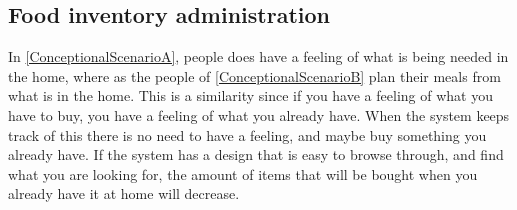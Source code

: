 \subsection{Food inventory administration}

In \ref{ConceptionalScenarioA}, people does have a feeling of what is being needed in the home, where as the people of \ref{ConceptionalScenarioB} plan their meals from what is in the home. This is a similarity since if you have a feeling of what you have to buy, you have a feeling of what you already have. When the system keeps track of this there is no need to have a feeling, and maybe buy something you already have. If the system has a design that is easy to browse through, and find what you are looking for, the amount of items that will be bought when you already have it at home will decrease.